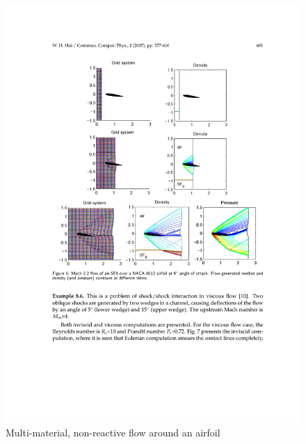 \documentclass{beamer}
\begin{document}
\begin{frame}
  \begin{figure}
    \includegraphics[width=\textwidth]{MultiMaterialAirfoilHui.pdf}
    \caption{Multi-material, non-reactive flow around an airfoil\cite{jia06}}
  \end{figure}
\end{frame}
\end{document}

